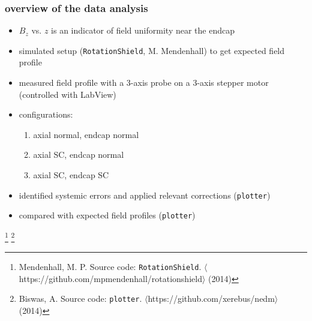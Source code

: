 \documentclass{beamer}
\newcommand{\bottomcite}{\let\thefootnote\relax\footnote}
\begin{document}
%
%
%
%

\begin{frame}
\frametitle{overview of the data analysis}

    \begin{itemize}
        \item $B_z$ vs. $z$ is an indicator of field uniformity near the endcap \pause
        \item simulated setup (\texttt{RotationShield}, M. Mendenhall) to get
            expected field profile \pause
        \item measured field profile with a 3-axis probe on a 3-axis stepper motor (controlled with LabView) \pause
        \item configurations:
            \begin{enumerate}
                \item axial normal, endcap normal
                \item axial SC, endcap normal
                \item axial SC, endcap SC \pause
            \end{enumerate}
        \item identified systemic errors and applied relevant corrections (\texttt{plotter})
        \item compared with expected field profiles (\texttt{plotter})
    \end{itemize}

    \bottomcite{Mendenhall, M. P. Source code: \texttt{RotationShield}.
    $\langle$https://github.com/mpmendenhall/rotationshield$\rangle$ (2014)}
    \bottomcite{Biswas, A. Source code: \texttt{plotter}.
    $\langle$https://github.com/xerebus/nedm$\rangle$ (2014)}

\end{frame}
\end{document}
